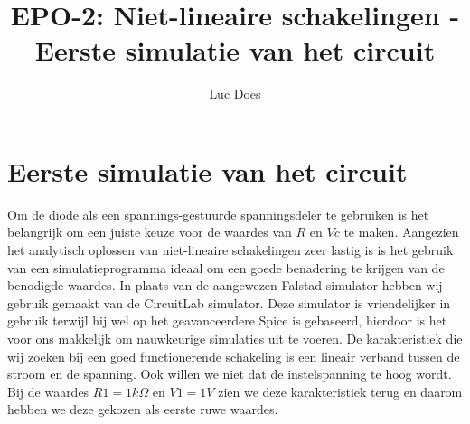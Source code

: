 \documentclass{report}
\title{EPO-2: Niet-lineaire schakelingen - Eerste simulatie van het circuit}
\author{Luc Does}
\begin{document}
\chapter{Eerste simulatie van het circuit}
\label{ch:Eerste simulatie van het circuit}

Om de diode als een spannings-gestuurde spanningsdeler te gebruiken is het belangrijk om een juiste keuze voor de waardes van $R$ en $Vc$ te maken. Aangezien het analytisch oplossen van niet-lineaire schakelingen zeer lastig is is het gebruik van een simulatieprogramma ideaal om een goede benadering te krijgen van de benodigde waardes. In plaats van de aangewezen Falstad simulator hebben wij gebruik gemaakt van de CircuitLab simulator. Deze simulator is vriendelijker in gebruik terwijl hij wel op het geavanceerdere  Spice is gebaseerd, hierdoor is het voor ons makkelijk om nauwkeurige simulaties uit te voeren.
\newline
De karakteristiek die wij zoeken bij een goed functionerende schakeling is een lineair verband tussen de stroom en de spanning. Ook willen we niet dat de instelspanning te hoog wordt. Bij de waardes $R1 = 1k\Omega$ en $V1 = 1V$ zien we deze karakteristiek terug en daarom hebben we deze gekozen als eerste ruwe waardes.
\end{document}

